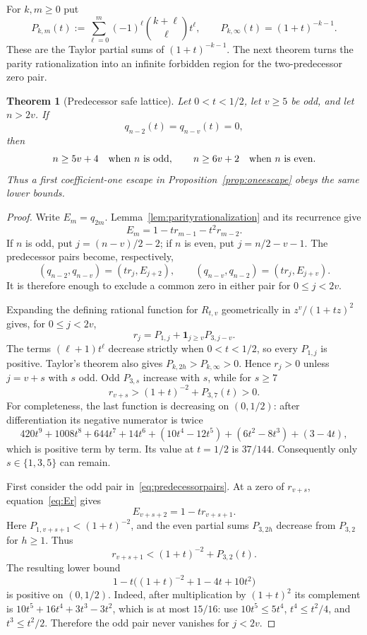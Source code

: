 \documentclass[11pt]{article}
\newtheorem{theorem}{Theorem}[section]
\theoremstyle{remark}
\numberwithin{equation}{section}
\begin{document}
For $k,m\ge0$ put
\[
 P_{k,m}(t):=\sum_{\ell=0}^{m}(-1)^\ell
              {k+\ell\choose\ell}t^\ell,
 \qquad P_{k,\infty}(t)=(1+t)^{-k-1}.
\]
These are the Taylor partial sums of $(1+t)^{-k-1}$.  The next theorem
turns the parity rationalization into an infinite forbidden region for the
two-predecessor zero pair.

\begin{theorem}[Predecessor safe lattice]\label{thm:safelattice}
Let $0<t<1/2$, let $v\ge5$ be odd, and let $n>2v$.  If
\[
 q_{n-2}(t)=q_{n-v}(t)=0,
\]
then
\[
 n\ge5v+4\quad\hbox{when $n$ is odd},\qquad
 n\ge6v+2\quad\hbox{when $n$ is even}.
\]
Thus a first coefficient-one escape in Proposition~\ref{prop:oneescape}
obeys the same lower bounds.
\end{theorem}
\begin{proof}
Write $E_m=q_{2m}$.  Lemma~\ref{lem:parityrationalization} and its recurrence
give
\begin{equation}\label{eq:Er}
 E_m=1-t r_{m-1}-t^2r_{m-2}.
\end{equation}
If $n$ is odd, put $j=(n-v)/2-2$; if $n$ is even, put
$j=n/2-v-1$.  The predecessor pairs become, respectively,
\begin{equation}\label{eq:predecessorpairs}
 (q_{n-2},q_{n-v})=(t r_j,E_{j+2}),\qquad
 (q_{n-v},q_{n-2})=(t r_j,E_{j+v}).
\end{equation}
It is therefore enough to exclude a common zero in either pair for
$0\le j<2v$.

Expanding the defining rational function for $R_{t,v}$ geometrically in
$z^v/(1+tz)^2$ gives, for $0\le j<2v$,
\begin{equation}\label{eq:firsttworblocks}
 r_j=P_{1,j}+\boldsymbol{1}_{j\ge v}P_{3,j-v}.
\end{equation}
The terms $(\ell+1)t^\ell$ decrease strictly when $0<t<1/2$, so every
$P_{1,j}$ is positive.  Taylor's theorem also gives
$P_{k,2h}>P_{k,\infty}>0$.  Hence $r_j>0$ unless
$j=v+s$ with $s$ odd.  Odd $P_{3,s}$ increase with $s$, while for $s\ge7$
\[
 r_{v+s}> (1+t)^{-2}+P_{3,7}(t)>0.
\]
For completeness, the last function is decreasing on $(0,1/2)$: after
differentiation its negative numerator is twice
\[
 420t^9+1008t^8+644t^7+14t^6
 +(10t^4-12t^5)+(6t^2-8t^3)+(3-4t),
\]
which is positive term by term.  Its value at $t=1/2$ is $37/144$.
Consequently only $s\in\{1,3,5\}$ can remain.

First consider the odd pair in~\eqref{eq:predecessorpairs}.  At a zero of
$r_{v+s}$, equation~\eqref{eq:Er} gives
\[
 E_{v+s+2}=1-t r_{v+s+1}.
\]
Here $P_{1,v+s+1}<(1+t)^{-2}$, and the even partial sums $P_{3,2h}$
decrease from $P_{3,2}$ for $h\ge1$.  Thus
\[
 r_{v+s+1}<(1+t)^{-2}+P_{3,2}(t).
\]
The resulting lower bound
\[
 1-t\bigl((1+t)^{-2}+1-4t+10t^2\bigr)
\]
is positive on $(0,1/2)$.  Indeed, after multiplication by $(1+t)^2$ its
complement is
$10t^5+16t^4+3t^3-3t^2$, which is at most $15/16$: use
$10t^5\le5t^4$, $t^4\le t^2/4$, and $t^3\le t^2/2$.
Therefore the odd pair never vanishes for $j<2v$.


\end{proof}
\end{document}
